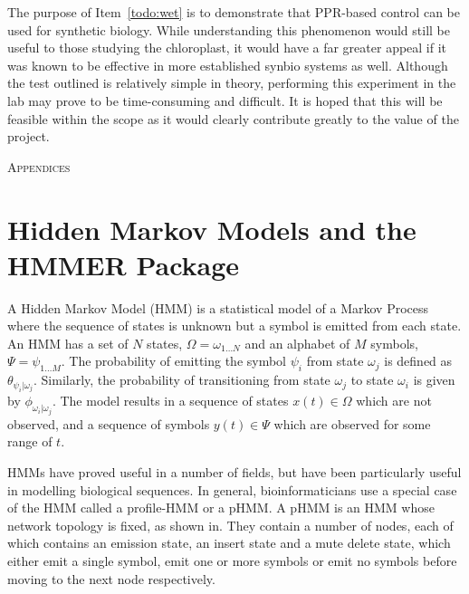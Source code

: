 \documentclass[twoside,a4paper]{article}
\begin{document}
\begin{multicols}{2}
The purpose of Item~\ref{todo:wet} is to demonstrate that PPR-based control can
be used for synthetic biology.
While understanding this phenomenon would still be useful to those studying
the chloroplast, it would have a far greater appeal if it was known to be
effective in more established synbio systems as well.
Although the test outlined is relatively simple in theory, performing this
experiment in the lab may prove to be time-consuming and difficult.
It is hoped that this will be feasible within the scope as it would clearly
contribute greatly to the value of the project.


\begin{center}
  \large\textsc{Appendices}
\end{center}

\appendix

\section{Hidden Markov Models and the HMMER Package}
\label{sec:HMMs}

A Hidden Markov Model (HMM) is a statistical model of a Markov Process where
the sequence of states is unknown but a symbol is emitted from each state. 
An HMM has a set of $N$ states, 
$\Omega = \omega_{1 \ldots N}$ and an alphabet of $M$ symbols, 
$\Psi = \psi_{1 \ldots M}$. 
The probability of emitting the symbol $\psi_i$ from state $\omega_j$ is 
defined as $\theta_{\psi_i | \omega_j}$.
Similarly, the probability of transitioning from state $\omega_j$ to state
$\omega_i$ is given by $\phi_{\omega_i | \omega_j}$.
The model results in a sequence of states $x(t) \in \Omega$ which are not
observed, and a sequence of symbols $y(t) \in \Psi$ which are observed for some
range of $t$.

HMMs have proved useful in a number of fields, but have been particularly
useful in modelling biological sequences. 
In general, bioinformaticians use a special case of the HMM called a
profile-HMM or a pHMM.
A pHMM is an HMM whose network topology is fixed, as shown in.
They contain a number of nodes, each of which contains an emission state, an
insert state and a mute delete state, which either emit a single symbol, emit
one or more symbols or emit no symbols before moving to the next node
respectively.


\end{multicols}
\end{document}
